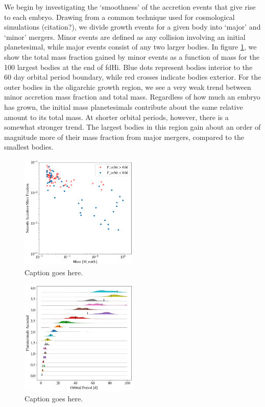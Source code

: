 \documentclass[twocolumn]{aastex63}
\begin{document}
We begin by investigating the `smoothness' of the accretion events that give rise to each embryo. Drawing from a common technique used for cosmological simulations (citation?), we divide growth events for a given body into `major' and `minor' mergers. Minor events are defined as any collision involving an initial planetesimal, while major events consist of any two larger bodies. In figure \ref{fig:minor_frac}, we show the total mass fraction gained by minor events as a function of mass for the 100 largest bodies at the end of fdHi. Blue dots represent bodies interior to the 60 day orbital period boundary, while red crosses indicate bodies exterior. For the outer bodies in the oligarchic growth region, we see a very weak trend between minor accretion mass fraction and total mass. Regardless of how much an embryo has grown, the initial mass planetesimals contribute about the same relative amount to its total mass. At shorter orbital periods, however, there is a somewhat stronger trend. The largest bodies in this region gain about an order of magnitude more of their mass fraction from major mergers, compared to the smallest bodies.

\begin{figure}
\begin{center}
    \includegraphics[width=0.5\textwidth]{figures/minor_frac.png}
    \caption{Caption goes here.\label{fig:minor_frac}}
\end{center}
\end{figure}

\begin{figure}
\begin{center}
    \includegraphics[width=0.5\textwidth]{figures/acc_zones.png}
    \caption{Caption goes here.\label{fig:acc_zones}}
\end{center}
\end{figure}
\end{document}
